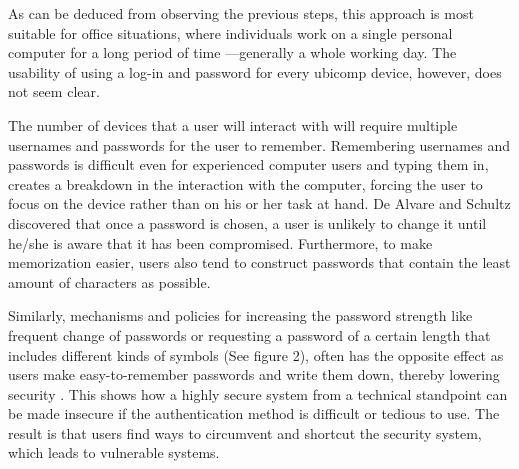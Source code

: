 \documentclass{article}
\begin{document}
As can be deduced from observing the previous steps, this approach is most suitable for office situations, where individuals work on a single personal computer for a long period of time ---generally a whole working day. The usability of using a log-in and password for every ubicomp device, however, does not seem clear. 

The number of devices that a user will interact with will require multiple usernames and passwords for the user to remember. Remembering usernames and passwords is difficult even for experienced computer users and typing them in, creates a breakdown in the interaction with the computer, forcing the user to focus on the device rather than on his or her task at hand.  De Alvare and Schultz\cite{dealvare1988framework} discovered that once a password is chosen, a user is unlikely to change it until he/she is aware that it has been compromised. Furthermore, to make memorization easier, users also tend to construct passwords that contain the least amount of characters as possible.

Similarly, mechanisms and policies for increasing the password strength like frequent change of passwords or requesting a password of a certain length that includes different kinds of symbols (See figure 2), often has the opposite effect as users make easy-to-remember passwords and write them down, thereby lowering security \cite{adams1999users}. This shows how a highly secure system from a technical standpoint can be made insecure if the authentication method is difficult or tedious to use. The result is that users find ways to circumvent and shortcut the security system, which leads to vulnerable systems. 
\end{document}
